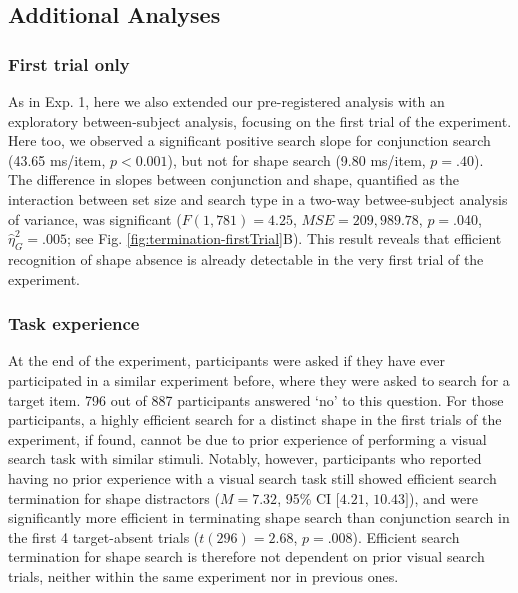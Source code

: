 \documentclass[12pt,twoside]{reedthesis}
\begin{document}
\hypertarget{additional-analyses}{%
\subsection{Additional Analyses}\label{additional-analyses}}

\hypertarget{first-trial-only}{%
\subsubsection*{First trial only}\label{first-trial-only}}

As in Exp. 1, here we also extended our pre-registered analysis with an exploratory between-subject analysis, focusing on the first trial of the experiment. Here too, we observed a significant positive search slope for conjunction search (43.65 ms/item, \(p<0.001\)), but not for shape search (9.80 ms/item, \(p=.40\)). The difference in slopes between conjunction and shape, quantified as the interaction between set size and search type in a two-way betwee-subject analysis of variance, was significant (\(F(1, 781) = 4.25\), \(\mathit{MSE} = 209,989.78\), \(p = .040\), \(\hat{\eta}^2_G = .005\); see Fig. \ref{fig:termination-firstTrial}B). This result reveals that efficient recognition of shape absence is already detectable in the very first trial of the experiment.

\hypertarget{task-experience}{%
\subsubsection*{Task experience}\label{task-experience}}

At the end of the experiment, participants were asked if they have ever participated in a similar experiment before, where they were asked to search for a target item. 796 out of 887 participants answered `no' to this question. For those participants, a highly efficient search for a distinct shape in the first trials of the experiment, if found, cannot be due to prior experience of performing a visual search task with similar stimuli. Notably, however, participants who reported having no prior experience with a visual search task still showed efficient search termination for shape distractors (\(M = 7.32\), 95\% CI \([4.21\), \(10.43]\)), and were significantly more efficient in terminating shape search than conjunction search in the first 4 target-absent trials (\(t(296) = 2.68\), \(p = .008\)). Efficient search termination for shape search is therefore not dependent on prior visual search trials, neither within the same experiment nor in previous ones.
\end{document}
